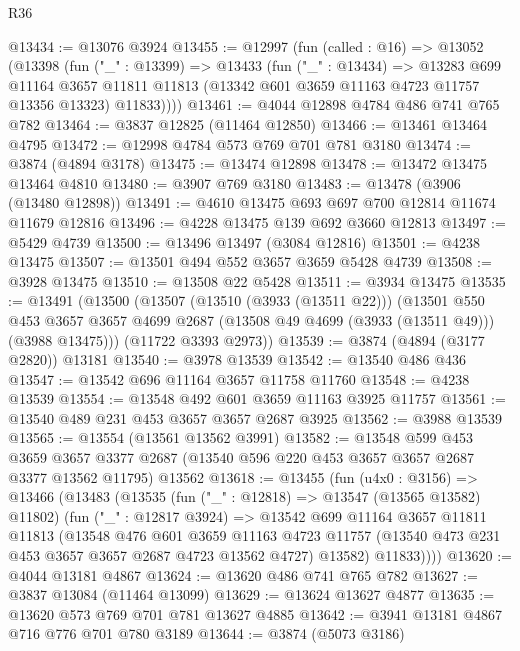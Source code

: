 \begin{lexlean}{R36}
\begin{coremodule}
@13434 := @13076 @3924
@13455 := @12997
    (fun (called : @16) =>
    @13052
      (@13398
        (fun ("_" : @13399) =>
        @13433
          (fun ("_" : @13434) =>
          @13283
            @699
            @11164
            @3657
            @11811
            @11813
            (@13342 @601 @3659 @11163 @4723 @11757 @13356 @13323)
            @11833))))
@13461 := @4044 @12898 @4784 @486 @741 @765 @782
@13464 := @3837 @12825 (@11464 @12850)
@13466 := @13461 @13464 @4795
@13472 := @12998 @4784 @573 @769 @701 @781 @3180
@13474 := @3874 (@4894 @3178)
@13475 := @13474 @12898
@13478 := @13472 @13475 @13464 @4810
@13480 := @3907 @769 @3180
@13483 := @13478 (@3906 (@13480 @12898))
@13491 := @4610 @13475 @693 @697 @700 @12814 @11674 @11679 @12816
@13496 := @4228 @13475 @139 @692 @3660 @12813
@13497 := @5429 @4739
@13500 := @13496 @13497 (@3084 @12816)
@13501 := @4238 @13475
@13507 := @13501 @494 @552 @3657 @3659 @5428 @4739
@13508 := @3928 @13475
@13510 := @13508 @22 @5428
@13511 := @3934 @13475
@13535 := @13491
    (@13500
      (@13507
        (@13510 (@3933 (@13511 @22)))
        (@13501
          @550
          @453
          @3657
          @3657
          @4699
          @2687
          (@13508 @49 @4699 (@3933 (@13511 @49)))
          (@3988 @13475)))
      (@11722 @3393 @2973))
@13539 := @3874 (@4894 (@3177 @2820)) @13181
@13540 := @3978 @13539
@13542 := @13540 @486 @436
@13547 := @13542 @696 @11164 @3657 @11758 @11760
@13548 := @4238 @13539
@13554 := @13548 @492 @601 @3659 @11163 @3925 @11757
@13561 := @13540 @489 @231 @453 @3657 @3657 @2687 @3925
@13562 := @3988 @13539
@13565 := @13554 (@13561 @13562 @3991)
@13582 := @13548
    @599
    @453
    @3659
    @3657
    @3377
    @2687
    (@13540 @596 @220 @453 @3657 @3657 @2687 @3377 @13562 @11795)
    @13562
@13618 := @13455
    (fun (u4x0 : @3156) =>
    @13466
      (@13483
        (@13535
          (fun ("_" : @12818) => @13547 (@13565 @13582) @11802)
          (fun ("_" : @12817 @3924) =>
          @13542
            @699
            @11164
            @3657
            @11811
            @11813
            (@13548
              @476
              @601
              @3659
              @11163
              @4723
              @11757
              (@13540 @473 @231 @453 @3657 @3657 @2687 @4723 @13562 @4727)
              @13582)
            @11833))))
@13620 := @4044 @13181 @4867
@13624 := @13620 @486 @741 @765 @782
@13627 := @3837 @13084 (@11464 @13099)
@13629 := @13624 @13627 @4877
@13635 := @13620 @573 @769 @701 @781 @13627 @4885
@13642 := @3941 @13181 @4867 @716 @776 @701 @780 @3189
@13644 := @3874 (@5073 @3186)

\end{coremodule}
\end{lexlean}

